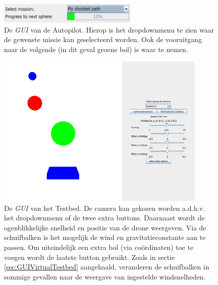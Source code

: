\begin{figure}[h]
	\centering
	\includegraphics[width=0.6\textwidth]{AutopilotGUI.png}
	\caption{De \textit{GUI} van de Autopilot. Hierop is het dropdownmenu te zien waar de gewenste missie kan geselecteerd worden. Ook de vooruitgang naar de volgende (in dit geval groene bol) is waar te nemen.}
\end{figure}
\begin{figure}[h]
	\centering
	\includegraphics[width=0.9\textwidth]{TestbedGUI.png}
	\caption{De \textit{GUI} van het Testbed. De camera kan gekozen worden a.d.h.v. het dropdownmenu of de twee extra buttons. Daarnaast wordt de ogenblikkelijke snelheid en positie van de drone weergeven. Via de schuifbalken is het mogelijk de wind en gravitatieconstante aan te passen. Om uiteindelijk een extra bol (via co\"ordinaten) toe te voegen wordt de laatste button gebruikt. Zoals in sectie \ref{sec:GUIVirtualTestbed} aangehaald, veranderen de schuifbalken in sommige gevallen naar de weergave van ingestelde windsnelheden.}
\end{figure}